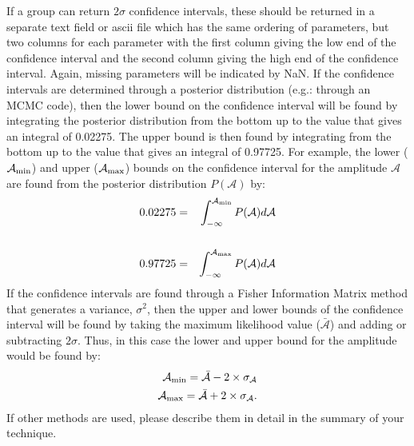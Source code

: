 \documentclass[11pt]{article}
\begin{document}
If a group can return $2\sigma$ confidence intervals, these should be returned in a separate text field or ascii file which has the same ordering of parameters, but two columns for each parameter with the first column giving the low end of the confidence interval and the second column giving the high end of the confidence interval. Again, missing parameters will be indicated by NaN. If the confidence intervals are determined through a posterior distribution (e.g.: through an MCMC code), then the lower bound on the confidence interval will be found by integrating the posterior distribution from the bottom up to the value that gives an integral of 0.02275. The upper bound is then found by integrating from the bottom up to the value that gives an integral of 0.97725. For example, the lower ($\mathcal{A}_{\rm min}$) and upper ($\mathcal{A}_{\rm max}$) bounds on the confidence interval for the amplitude $\mathcal{A}$ are found from the posterior distribution $P(\mathcal{A})$ by:
\begin{eqnarray}
0.02275 & = & \int_{-\infty}^{\mathcal{A}_{\rm min}}{P(\mathcal{A})d\mathcal{A}} \\
\nonumber \\
0.97725 & = & \int_{-\infty}^{\mathcal{A}_{\rm max}}{P(\mathcal{A})d\mathcal{A}} \\
\end{eqnarray}
If the confidence intervals are found through a Fisher Information Matrix method that generates a variance, $\sigma^2$, then the upper and lower bounds of the confidence interval will be found by taking the maximum likelihood value ($\bar{\mathcal{A}}$) and adding or subtracting $2\sigma$. Thus, in this case the lower and upper bound for the amplitude would be found by:
\begin{eqnarray}
\mathcal{A}_{\rm min} = \bar{\mathcal{A}} - 2 \times \sigma_{\mathcal{A}} \\
\mathcal{A}_{\rm max} = \bar{\mathcal{A}} + 2 \times \sigma_{\mathcal{A}}.
\end{eqnarray}
If other methods are used, please describe them in detail in the summary of your technique.
\end{document}
